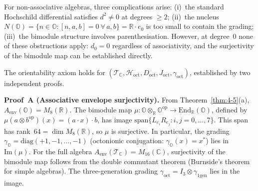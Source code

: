 For non-associative algebras, three complications arise: (i)~the standard Hochschild differential satisfies $d^2 \neq 0$ at degrees $\geq 2$; (ii)~the nucleus $N(\mathbb{O}) = \{n \in \mathbb{O} : [n, a, b] = 0\ \forall\, a, b\} = \mathbb{R} \cdot e_0$ is too small to contain the grading; (iii)~the bimodule structure involves parenthesisation. However, at degree~0 none of these obstructions apply: $d_0 = 0$ regardless of associativity, and the surjectivity of the bimodule map can be established directly.

\begin{theorem}\label{thm:4-6}
The orientability axiom holds for $(\mathcal{T}_{\mathbb{C}}, \mathcal{H}_{\mathrm{oct}}, D_{\mathrm{oct}}, J_{\mathrm{oct}}, \gamma_{\mathrm{oct}})$, established by two independent proofs.

\textbf{Proof~A (Associative envelope surjectivity).}
From Theorem~\ref{thm:4-5}(a), $A_{\mathrm{env}}(\mathbb{O}) = M_8(\mathbb{R})$. The bimodule map $\mu\colon \mathbb{O} \otimes_{\mathbb{R}} \mathbb{O}^{\mathrm{op}} \to \mathrm{End}_{\mathbb{R}}(\mathbb{O})$, defined by $\mu(a \otimes b^{\mathrm{op}})(x) = (a \cdot x) \cdot b$, has image $\mathrm{span}\{L_{e_i} R_{e_j} : i, j = 0, \ldots, 7\}$. This span has rank~$64 = \dim M_8(\mathbb{R})$, so $\mu$ is surjective. In particular, the grading $\gamma_{\mathbb{O}} = \mathrm{diag}(+1, -1, \ldots, -1)$ (octonionic conjugation: $\gamma_{\mathbb{O}}(x) = x^*$) lies in $\mathrm{Im}(\mu)$. For the full algebra $A_{\mathrm{env}}(\mathcal{T}_{\mathbb{C}}) = M_{16}(\mathbb{C})$, surjectivity of the bimodule map follows from the double commutant theorem (Burnside's theorem for simple algebras). The three-generation grading $\gamma_{\mathrm{oct}} = I_3 \otimes \gamma_{1\mathrm{gen}}$ lies in the image.


\end{theorem}
